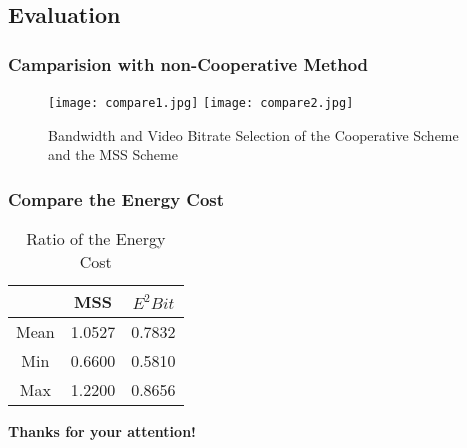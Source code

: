 \documentclass[table]{beamer}
\begin{document}
\subsection{Evaluation}
\begin{frame}
	\frametitle{Camparision with non-Cooperative Method}
	\begin{figure}[htbp]
    \centering
		\texttt{[image: compare1.jpg]}
		\texttt{[image: compare2.jpg]}
    \caption{Bandwidth and Video Bitrate Selection of the Cooperative Scheme and the MSS Scheme}
    \label{fig:bv}
    \end{figure}
\end{frame}

\begin{frame}
	\frametitle{Compare the Energy Cost}
    \begin{table}
    \centering
    \caption{Ratio of the Energy Cost}
    \begin{tabular}{|c|c|c|}
    \hline
    \rowcolor{blue!50} &MSS&$E^2Bit$\\
    \hline
    Mean & 1.0527 & 0.7832 \\
    \hline
    Min & 0.6600 & 0.5810 \\
    \hline
    Max & 1.2200 & 0.8656 \\
    \hline
    \end{tabular}
    \end{table}
\end{frame}
%

\begin{frame}[plain]
	\begin{spacing}{1.5}
	\begin{center}
	\Huge{\textbf{Thanks for your attention!}}
\end{center}
\end{spacing}
\end{frame}
\end{document}
